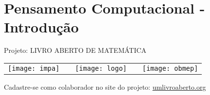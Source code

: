 
\ifnum{}
\renewcommand\chapterillustration{./abertura-computacional}
\else
\renewcommand\chapterillustration{./abertura-computacional-professor}
\fi

\renewcommand\chapterwhat{Pensamento computacional e noções básicas de linguagem de programação.
}
\renewcommand\chapterbecause{Os computadores estão presentes em quase todas as atividades humanas na atualidade e, por isso, desenvolver o pensamento computacional e conhecer noções básicas de linguagens de programação pode ser fundamental para sua vida profissional, trajetória acadêmica e participação efetiva na sociedade.
} 
\chapter{Pensamento Computacional - Introdução}
\label{computacional-chap}

\mbox{}\thispagestyle{empty}\clearpage

\thispagestyle{empty}

\begin{center}
Projeto: LIVRO ABERTO DE MATEMÁTICA

\noindent \begin{tabular}{lcccr}
\texttt{[image: impa]}& \quad\quad& \texttt{[image: logo]} & \quad\quad& \texttt{[image: obmep]} 
\end{tabular}
\end{center}

\vspace*{.3cm}

Cadastre-se como colaborador no site do projeto: \url{umlivroaberto.org}





